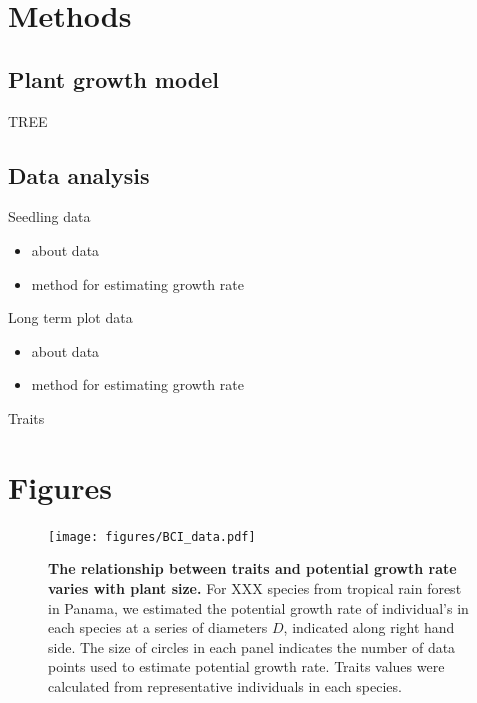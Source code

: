 \documentclass[12pt, a4paper]{article}
\begin{document}
\section{Methods}\label{methods}

\subsection{Plant growth model}\label{plant-growth-model}

TREE

\subsection{Data analysis}\label{data-analysis}

Seedling data

\begin{itemize}
\itemsep1pt\parskip0pt
\item
  about data
\item
  method for estimating growth rate
\end{itemize}

Long term plot data

\begin{itemize}
\itemsep1pt\parskip0pt
\item
  about data
\item
  method for estimating growth rate
\end{itemize}

Traits

\newpage

\section{Figures}\label{figures}

\begin{figure}[htbp]
\centering
\texttt{[image: figures/BCI\_data.pdf]}
\caption{\textbf{The relationship between traits and potential growth
rate varies with plant size.} For XXX species from tropical rain forest
in Panama, we estimated the potential growth rate of individual's in
each species at a series of diameters \(D\), indicated along right hand
side. The size of circles in each panel indicates the number of data
points used to estimate potential growth rate. Traits values were
calculated from representative individuals in each species.
\label{f-BCI}}
\end{figure}

\newpage
\end{document}

